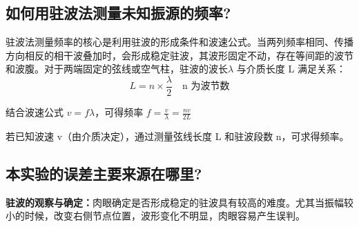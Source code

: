 \documentclass[]{../template/Report}%
\begin{document}
\begin{fullreportonly}
\subsection{如何用驻波法测量未知振源的频率?}
驻波法测量频率的核心是利用驻波的形成条件和波速公式。当两列频率相同、传播方向相反的相干波叠加时，会形成稳定驻波，其波形固定不动，存在等间距的波节和波腹。对于两端固定的弦线或空气柱，驻波的波长$\lambda$ 与介质长度 L 满足关系：
\[
L = n \times \frac{\lambda}{2} \quad \text{n 为波节数}
\]
\par
结合波速公式 $v = f \lambda$，可得频率 $f = \frac{v}{\lambda} = \frac{nv}{2L}$
\par
若已知波速 v（由介质决定），通过测量弦线长度 L 和驻波段数 n，可求得频率。
\subsection{本实验的误差主要来源在哪里?}
\textbf{驻波的观察与确定：}肉眼确定是否形成稳定的驻波具有较高的难度。尤其当振幅较小的时候，改变右侧节点位置，波形变化不明显，肉眼容易产生误判。

\end{fullreportonly}
\insertnotes
\end{document}

